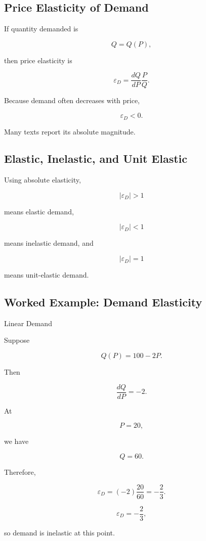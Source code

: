 \subsection{Price Elasticity of Demand}
\label{subsec:price-elasticity-demand}

If quantity demanded is

\[
Q=Q(P),
\]

then price elasticity is

\[
\boxed{
\varepsilon_D
=
\frac{dQ}{dP}
\frac{P}{Q}.
}
\]

Because demand often decreases with price,

\[
\varepsilon_D<0.
\]

Many texts report its absolute magnitude.

\subsection{Elastic, Inelastic, and Unit Elastic}
\label{subsec:elasticity-classification}

Using absolute elasticity,

\[
\boxed{
|\varepsilon_D|>1
}
\]

means elastic demand,

\[
\boxed{
|\varepsilon_D|<1
}
\]

means inelastic demand, and

\[
\boxed{
|\varepsilon_D|=1
}
\]

means unit-elastic demand.

\subsection{Worked Example: Demand Elasticity}
\label{subsec:worked-demand-elasticity}

\begin{workedexamplebox}{Linear Demand}

Suppose

\[
Q(P)=100-2P.
\]

Then

\[
\frac{dQ}{dP}
=
-2.
\]

At

\[
P=20,
\]

we have

\[
Q=60.
\]

Therefore,

\[
\varepsilon_D
=
(-2)\frac{20}{60}
=
-\frac23.
\]

\begin{answerbox}
\[
\boxed{
\varepsilon_D=-\frac23,
}
\]

so demand is inelastic at this point.
\end{answerbox}

\end{workedexamplebox}

